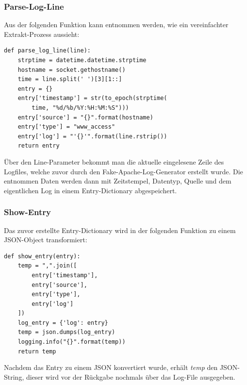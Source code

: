 \subsubsection{Parse-Log-Line}
Aus der folgenden Funktion kann entnommen werden, wie ein vereinfachter Extrakt-Prozess aussieht:
\begin{lstlisting}[caption={Extract-Code}]
def parse_log_line(line):
    strptime = datetime.datetime.strptime
    hostname = socket.gethostname()
    time = line.split(' ')[3][1::]
    entry = {}
    entry['timestamp'] = str(to_epoch(strptime(
        time, "%d/%b/%Y:%H:%M:%S")))
    entry['source'] = "{}".format(hostname)
    entry['type'] = "www_access"
    entry['log'] = "'{}'".format(line.rstrip())
    return entry
\end{lstlisting}
\vspace{4mm}\par
Über den Line-Parameter bekommt man die aktuelle eingelesene Zeile des Logfiles, welche zuvor durch den Fake-Apache-Log-Generator erstellt wurde. Die entnommen Daten werden dann mit Zeitstempel, Datentyp, Quelle und dem eigentlichen Log in einem Entry-Dictionary abgespeichert. 
\subsubsection{Show-Entry}
Das zuvor erstellte Entry-Dictionary  wird in der folgenden Funktion zu einem JSON-Object transformiert:
\begin{lstlisting}[caption={Tranform-Code}]
def show_entry(entry):
    temp = ",".join([
        entry['timestamp'],
        entry['source'],
        entry['type'],
        entry['log']
    ])
    log_entry = {'log': entry}
    temp = json.dumps(log_entry)
    logging.info("{}".format(temp))
    return temp
\end{lstlisting}
\vspace{4mm}\par
Nachdem das Entry zu einem JSON konvertiert wurde, erhält \textit{temp} den JSON-String, dieser wird vor der Rückgabe nochmals über das Log-File ausgegeben.
